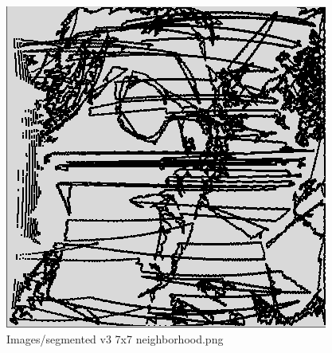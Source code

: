 \begin{figure}[H]
\includegraphics[width=\textwidth]{Images/segmented_v3_7x7_neighborhood.png}
\caption{Images/segmented v3 7x7 neighborhood.png}
\label{fig:Images/segmented v3 7x7 neighborhood.png}
\end{figure}
